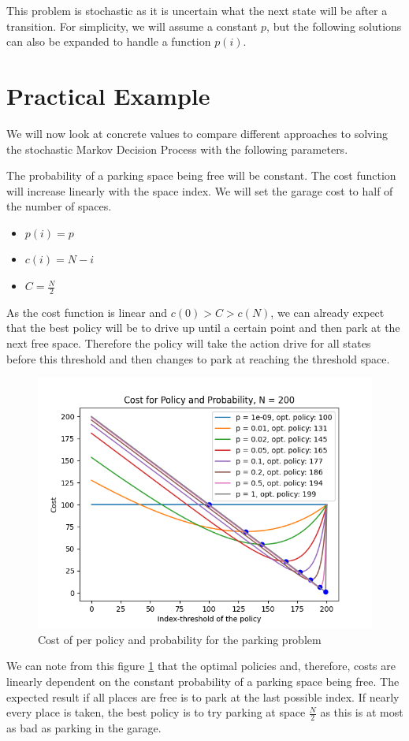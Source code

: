 This problem is stochastic as it is uncertain what the next state will be after a transition. For simplicity, we will assume a constant $p$, but the following solutions can also be expanded to handle a function $p(i)$.

\section{Practical Example}
\label{sec:practical}
We will now look at concrete values to compare different approaches to solving the stochastic Markov Decision Process with the following parameters.

The probability of a parking space being free will be constant. The cost function will increase linearly with the space index. We will set the garage cost to half of the number of spaces.
\begin{itemize}
	\item $p(i) = p$
	\item $c(i) = N-i$
	\item $C = \frac{N}{2}$
\end{itemize}

As the cost function is linear and $c(0) > C > c(N)$, we can already expect that the best policy will be to drive up until a certain point and then park at the next free space. Therefore the policy will take the action drive for all states before this threshold and then changes to park at reaching the threshold space.

\begin{figure}[htp]
	\label{figure}
	\centering
	\includegraphics[scale=0.6]{figures/code_statistics/strategy_probabilities_200.png}
	\caption{Cost of per policy and probability for the parking problem}
\end{figure}
We can note from this figure \ref{figure} that the optimal policies and, therefore, costs are linearly dependent on the constant probability of a parking space being free. The expected result if all places are free is to park at the last possible index. If nearly every place is taken, the best policy is to try parking at space $\frac{N}{2}$ as this is at most as bad as parking in the garage.


